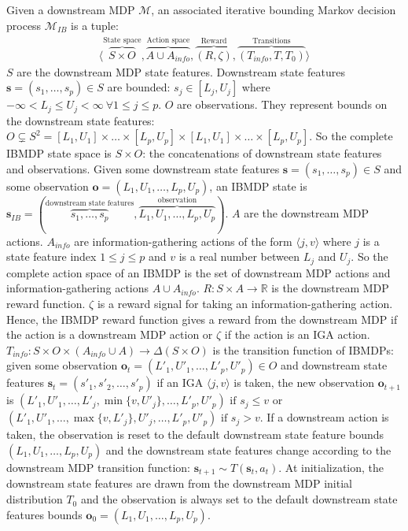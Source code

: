\begin{definition}\label{def:ibmdp}
Given a downstream MDP $\mathcal{M}$, an associated iterative bounding Markov decision process $\mathcal{M}_{IB}$ is a tuple:
\begin{align*}
    \langle \overbrace{S \times O}^{\text{State space}}, \overbrace{A \cup A_{info}}^{\text{Action space}}, \overbrace{(R, \zeta)}^{\text{Reward}}, \overbrace{(T_{info}, T, T_0)}^{\text{Transitions}}\rangle
\end{align*}
$S$ are the downstream MDP state features. Downstream state features $\boldsymbol{s} = (s_1, \dots, s_p)\in S$ are bounded: $s_j \in [L_j, U_j]$ where $-\infty < L_j \leq U_j < \infty \ \forall 1\leq j \leq p$.
$O$ are observations. They represent bounds on the downstream state features: $O\subsetneq S^2 =  [L_1, U_1]\times \dots \times [L_p, U_p] \times [L_1, U_1]\times \dots \times [L_p, U_p]$. So the complete IBMDP state space is $S \times O$: the concatenations of downstream state features and observations.
Given some downstream state features $\boldsymbol{s} = (s_1, \dots, s_p)\in S$ and some observation $\boldsymbol{o} = (L_1, U_1, \dots, L_p, U_p)$, an IBMDP state is $\boldsymbol{s}_{IB} = (\overbrace{s_1, \dots, s_p}^{\text{downstream state features}}, \overbrace{L_1, U_1, \dots, L_p, U_p}^{\text{observation}})$.
$A$ are the downstream MDP actions.
$A_{info}$ are information-gathering actions of the form $\langle j, v \rangle$ where $j$ is a state feature index $1 \leq j \leq p$ and $v$ is a real number between $L_j$ and $U_j$. So the complete action space of an IBMDP is the set of downstream MDP actions and information-gathering actions $A \cup A_{info}$.
$R: S\times A \rightarrow \mathbb{R}$ is the downstream MDP reward function.
$\zeta$ is a reward signal for taking an information-gathering action.
Hence, the IBMDP reward function gives a reward from the downstream MDP if the action is a downstream MDP action or $\zeta$ if the action is an IGA action.
$T_{info}: S\times O \times( A_{info} \cup A )\rightarrow \Delta (S\times O)$ is the transition function of IBMDPs: 
given some observation $\boldsymbol{o}_t = (L'_1, U'_1, \dots, L'_p, U'_p) \in O$ and downstream state features $\boldsymbol{s}_t=(s'_1, s'_2, \dots, s'_p)$ if an IGA $\langle j, v \rangle$ is taken, the new observation $\boldsymbol{o}_{t+1}$ is $(L'_1, U'_1, \dots , L'_j, \min\{v, U'_j\}, \dots , L'_p, U'_p) \text{ if } s_j \leq v$ or $(L'_1, U'_1, \dots , \max\{v, L'_j\}, U'_j, \dots , L'_p, U'_p) \text{ if } s_j > v$.
If a downstream action is taken, the observation is reset to the default downstream state feature bounds $(L_1, U_1,\dots, L_p, U_p)$ and the downstream state features change according to the downstream MDP transition function: $\boldsymbol{s}_{t+1}\sim T(\boldsymbol{s}_t, a_t)$.
At initialization, the downstream state features are drawn from the downstream MDP initial distribution $T_0$ and the observation is always set to the default downstream state features bounds $\boldsymbol{o}_0=(L_1, U_1,\dots, L_p, U_p)$.
\end{definition}

